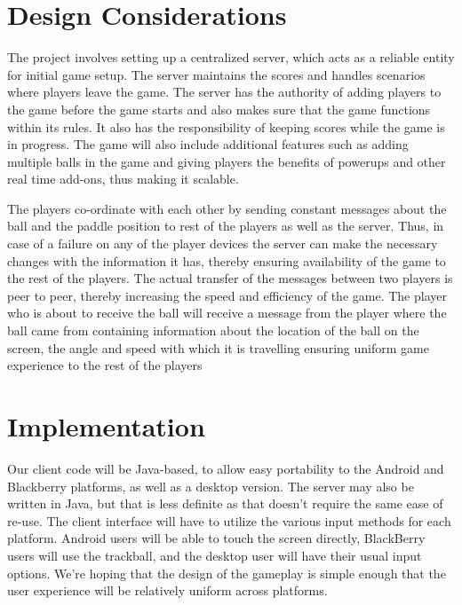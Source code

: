 \documentclass{sig-alternate}
\begin{document}
\section{Design Considerations}
\label{design considerations}


The project involves setting up a centralized server, which acts as a
reliable entity for initial game setup.  The server maintains the scores
and handles scenarios where players leave the game.  The server has the
authority of adding players to the game before the game starts and also
makes sure that the game functions within its rules.  It also has the
responsibility of keeping scores while the game is in progress.  The game
will also include additional features such as adding multiple balls in the
game and giving players the benefits of powerups and other real time
add-ons, thus making it scalable.  

The players co-ordinate with each other by sending constant messages about
the ball and the paddle position to rest of the players as well as the
server.  Thus, in case of a failure on any of the player devices the server
can make the necessary changes with the information it has, thereby
ensuring availability of the game to the rest of the players.  The actual
transfer of the messages between two players is peer to peer, thereby
increasing the speed and efficiency of the game.  The player who is about
to receive the ball will receive a message from the player where the ball
came from containing information about the location of the ball on the
screen, the angle and speed with which it is travelling ensuring uniform
game experience to the rest of the players

\section{Implementation}
\label{implementation}


Our client code will be Java-based, to allow easy portability to the
Android and Blackberry platforms, as well as a desktop version.  The server
may also be written in Java, but that is less definite as that doesn't
require the same ease of re-use.  The client interface will have to utilize
the various input methods for each platform.  Android users will be able to
touch the screen directly, BlackBerry users will use the trackball, and the
desktop user will have their usual input options.  We're hoping that the
design of the gameplay is simple enough that the user experience will be
relatively uniform across platforms.
\end{document}
